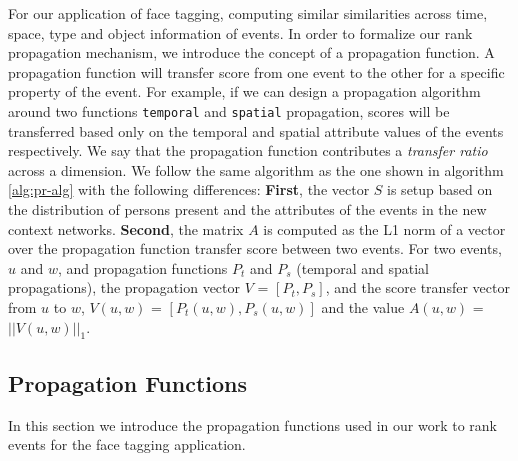 For our application of face tagging, computing similar similarities across time, space, type and object information of events. In order to formalize our rank propagation mechanism, we introduce the concept of a propagation function. A propagation function will transfer score from one event to the other for a specific property of the event. For example, if we can design a propagation algorithm around two functions \texttt{temporal} and \texttt{spatial} propagation, scores will be transferred based only on the temporal and spatial attribute values of the events respectively. We say that the propagation function contributes a \textit{transfer ratio} across a dimension. We follow the same algorithm as the one shown in algorithm \ref{alg:pr-alg} with the following differences: \textbf{First}, the vector $S$ is setup based on the distribution of persons present and the attributes of the events in the new context networks. \textbf{Second}, the matrix $A$ is computed as the L1 norm of a vector over the propagation function transfer score between two events. For two events, $u$ and $w$, and propagation functions $P_t$ and $P_s$ (temporal and spatial propagations), the propagation vector $V$ = $[P_t, P_s]$, and the score transfer vector from $u$ to $w$, $V(u, w)$ = $[P_t(u, w), P_s(u, w)]$ and the value $A(u, w)$ = $||V(u, w)||_1$.

\subsection{Propagation Functions}

In this section we introduce the propagation functions used in our work to rank events for the face tagging application.

